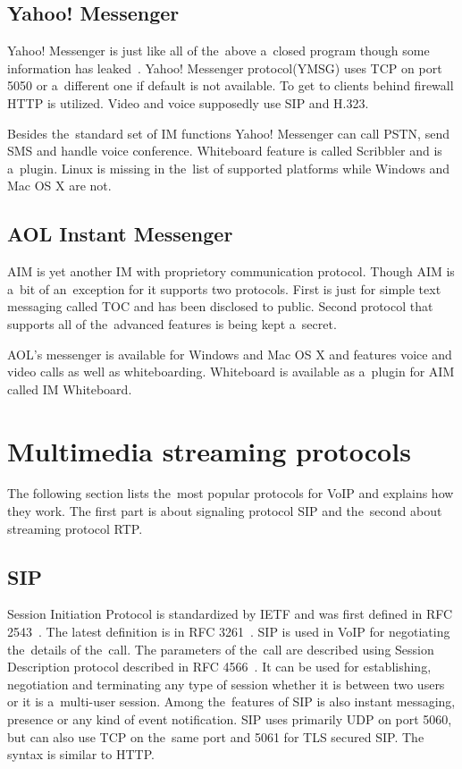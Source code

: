 \subsection*{Yahoo! Messenger}
Yahoo! Messenger is just like all of the~above a~closed program though some information has leaked~\cite{wikipediaYahoo}. Yahoo! Messenger protocol(YMSG) uses TCP on port 5050 or a~different one if default is not available. To get to clients behind firewall HTTP is utilized. Video and voice supposedly use SIP and H.323.

Besides the~standard set of IM functions Yahoo! Messenger can call PSTN, send SMS and handle voice conference. Whiteboard feature is called Scribbler and is a~plugin. Linux is missing in the~list of supported platforms while Windows and Mac OS X are not.

\subsection*{AOL Instant Messenger}
AIM is yet another IM with proprietory communication protocol. Though AIM is a~bit of an~exception for it supports two protocols. First is just for simple text messaging called TOC and has been disclosed to public. Second protocol that supports all of the~advanced features is being kept a~secret.

AOL's messenger is available for Windows and Mac OS X and features voice and video calls as well as whiteboarding. Whiteboard is available as a~plugin for AIM called IM Whiteboard. 

\section{Multimedia streaming protocols}
The following section lists the~most popular protocols for VoIP and explains how they work. The first part is about signaling protocol SIP and the~second about streaming protocol RTP.

\subsection*{SIP}
Session Initiation Protocol is standardized by IETF and was first defined in RFC 2543~\cite{sipRFC}. The latest definition is in RFC 3261~\cite{sipRFC2}. SIP is used in VoIP for negotiating the~details of the~call. The parameters of the~call are described using Session Description protocol described in RFC 4566~\cite{sdpRFC}. It can be used for establishing, negotiation and terminating any type of session whether it is between two users or it is a~multi-user session. Among the~features of SIP is also instant messaging, presence or any kind of event notification. SIP uses primarily UDP on port 5060, but can also use TCP on the~same port and 5061 for TLS secured SIP. The syntax is similar to HTTP.

